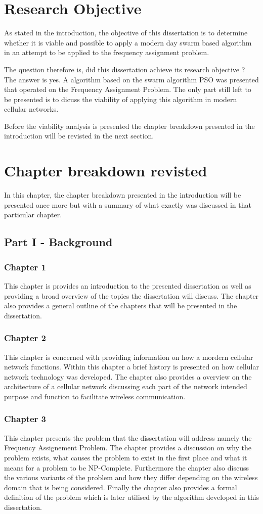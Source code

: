 \section{Research Objective}
As stated in the introduction, the objective of this dissertation is to determine whether it is viable and possible to apply a modern day swarm based algorithm in an attempt to be applied to the frequency assignment problem. 

The question therefore is, did this dissertation achieve its research objective ? The answer is yes. A algorithm based on the swarm algorithm PSO was presented that operated on the Frequency Assignment Problem. The only part still left to be presented is to dicuss the viability of applying this algorithm in modern cellular networks.

Before the viability analysis is presented the chapter breakdown presented in the introduction will be revisted in the next section.

\section{Chapter breakdown revisted}
In this chapter, the chapter breakdown presented in the introduction will be presented once more but with a summary of what exactly was discussed in that particular chapter.
\subsection{Part I - Background}
\subsubsection{Chapter 1}
This chapter is provides an introduction to the presented dissertation as well as providing a broad overview of the topics the dissertation will discuss. The chapter also provides a general outline of the chapters that will be presented in the dissertation.
\subsubsection{Chapter 2}
This chapter is concerned with providing information on how a mordern cellular network functions. Within this chapter a brief history is presented on how cellular network technology was developed. The chapter also provides a overview on the architecture of a cellular network discussing each part of the network intended purpose and function to facilitate wireless communication.
\subsubsection{Chapter 3}
This chapter presents the problem that the dissertation will address namely the Frequency Assignement Problem. The chapter provides a discussion on why the problem exists, what causes the problem to exist in the first place and what it means for a problem to be NP-Complete. Furthermore the chapter also discuss the various variants of the problem and how they differ depending on the wireless domain that is being considered. Finally the chapter also provides a formal definition of the problem which is later utilised by the algorithm developed in this dissertation.
